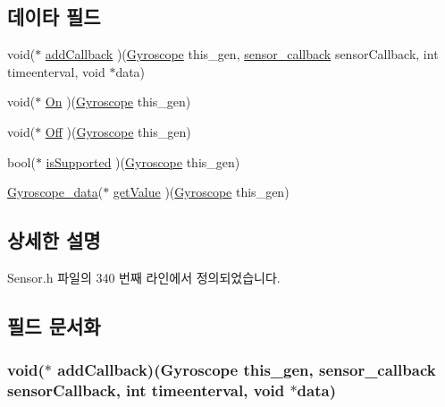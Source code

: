 \subsection*{데이타 필드}
\begin{DoxyCompactItemize}
\item 
void($\ast$ \hyperlink{struct___gyroscope_a9ee901b5cbca422e01009632df55dbc0}{add\-Callback} )(\hyperlink{_sensor_8h_a24afd023a4f5a5d89435215fc22449b9}{Gyroscope} this\-\_\-gen, \hyperlink{_sensor_8h_ad8114207845fc5e0aa30832f0c718cd6}{sensor\-\_\-callback} sensor\-Callback, int timeenterval, void $\ast$data)
\item 
void($\ast$ \hyperlink{struct___gyroscope_a001e94a565eb41447701e3519d2d7a75}{On} )(\hyperlink{_sensor_8h_a24afd023a4f5a5d89435215fc22449b9}{Gyroscope} this\-\_\-gen)
\item 
void($\ast$ \hyperlink{struct___gyroscope_a16950c07b1deb4c02cd4909b4c78b21e}{Off} )(\hyperlink{_sensor_8h_a24afd023a4f5a5d89435215fc22449b9}{Gyroscope} this\-\_\-gen)
\item 
bool($\ast$ \hyperlink{struct___gyroscope_ac0f373cd10a93722406c823688676dee}{is\-Supported} )(\hyperlink{_sensor_8h_a24afd023a4f5a5d89435215fc22449b9}{Gyroscope} this\-\_\-gen)
\item 
\hyperlink{_sensor_8h_a10859114954f1b73537e418caa4cd698}{Gyroscope\-\_\-data}($\ast$ \hyperlink{struct___gyroscope_a9e5519a135ce1a2b58d7e21fd2d53171}{get\-Value} )(\hyperlink{_sensor_8h_a24afd023a4f5a5d89435215fc22449b9}{Gyroscope} this\-\_\-gen)
\end{DoxyCompactItemize}


\subsection{상세한 설명}


Sensor.\-h 파일의 340 번째 라인에서 정의되었습니다.



\subsection{필드 문서화}
\hypertarget{struct___gyroscope_a9ee901b5cbca422e01009632df55dbc0}{
\subsubsection[{add\-Callback}]{\setlength{\rightskip}{0pt plus 5cm}void($\ast$  add\-Callback)({\bf Gyroscope} this\-\_\-gen, {\bf sensor\-\_\-callback} sensor\-Callback, int timeenterval, void $\ast$data)}}\label{struct___gyroscope_a9ee901b5cbca422e01009632df55dbc0}


